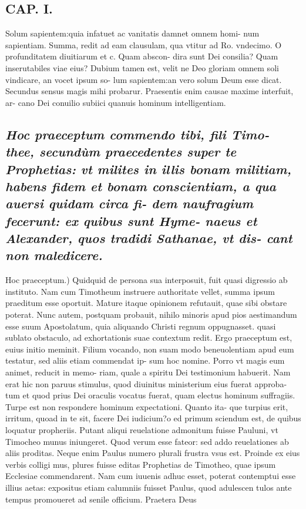 \documentclass{article}
\begin{document}
\begin{pages}
\section*{CAP. I. }
\marginpar{[ p.13 ]}\pstart Solum sapientem:quia infatuet ac vanitatis damnet omnem homi- num sapientiam. Summa, redit ad eam clausulam, qua vtitur ad Ro. vndecimo. O profunditatem diuitiarum et c. Quam abscon- dira sunt Dei consilia? Quam inserutabiles viae eius? Dubium tamen est, velit ne Deo gloriam omnem soli vindicare, an vocet ipsum so- lum sapientem:an vero solum Deum esse dicat. Secundus sensus magis mihi probarur. Praesentis enim causae maxime interfuit, ar- cano Dei conuilio subiici quanuis hominum intelligentiam.  \pend
{}
{}
\subsection*{\textit{Hoc praeceptum commendo tibi, fili Timo- thee, secundùm praecedentes super te Prophetias: vt milites in illis bonam militiam, habens fidem et bonam conscientiam, a qua auersi quidam circa fi- dem naufragium fecerunt: ex quibus sunt Hyme- naeus et Alexander, quos tradidi Sathanae, vt dis- cant non maledicere. }}\pstart Hoc praeceptum.) Quidquid de persona sua interposuit, fuit quasi digressio ab instituto. Nam cum Timotheum instruere authoritate vellet, summa ipsum praeditum esse oportuit. Mature itaque opinionem refutauit, quae sibi obstare poterat. Nunc autem, postquam probauit, nihilo minoris apud pios aestimandum esse suum Apostolatum, quia aliquando Christi regnum oppugnasset. quasi sublato obstaculo, ad exhortationis suae contextum redit. Ergo praeceptum est, euius initio meminit. Filium vocando, non suam modo beneuolentiam apud eum testatur, sed aliis etiam commendat ip- sum hoc nomine. Porro vt magis eum animet, reducit in memo- riam, quale a spiritu Dei testimonium habuerit. Nam erat hic non paruus stimulus, quod diuinitus ministerium eius fuerat approba- tum et quod prius Dei oraculis vocatus fuerat, quam electus hominum suffragiis. Turpe est non respondere hominum expectationi. Quanto ita- que turpius erit, irritum, quoad in te sit, facere Dei iudicium?o ed primum sciendum est, de quibus loquatur propheriis. Putant aliqui reuelatione admonitum fuisse Pauluni, vt Timocheo munus iniungeret. Quod verum esse fateor: sed addo reuelationes ab aliis proditas. Neque enim Paulus numero plurali frustra vsus est. Proinde ex eius verbis colligi mus, plures fuisse editas Prophetias de Timotheo, quae ipsum Ecclesiae commendarent. Nam cum iuuenis adhuc esset, poterat contemptui esse illius aetas: expositus etiam calumniis fuisset Paulus, quod adulescen tulos ante tempus promoueret ad senile officium. Praetera Deus  \pend

\end{pages}
\end{document}
